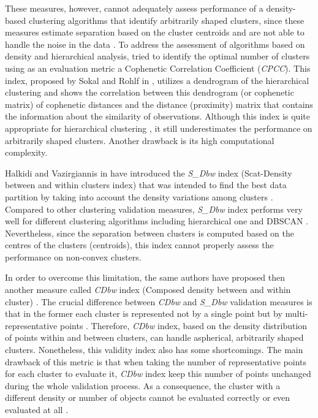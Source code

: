 \documentclass[fontsize=12pt,a4paper,twoside,openany]{scrbook}
\begin{document}
These measures, however, cannot adequately assess performance of a density-based clustering algorithms that identify arbitrarily shaped clusters, since these measures estimate separation based on the cluster centroids and are not able to handle the noise in the data \parencite{Moulavi14}. To address the assessment of algorithms based on density and hierarchical analysis, \textcite{Saracli13} tried to identify the optimal number of clusters using as an evaluation metric a Cophenetic Correlation Coefficient (\emph{CPCC}). This index, proposed by Sokal and Rohlf in \cite*{Sokal62}, utilizes a dendrogram of the hierarchical clustering and shows the correlation between this dendrogram (or cophenetic matrix) of cophenetic distances and the distance (proximity) matrix that contains the information about the similarity of observations. Although this index is quite appropriate for hierarchical clustering \parencite{Palacio19}, it still underestimates the performance on arbitrarily shaped clusters. Another drawback is its high computational complexity.

Halkidi and Vazirgiannis in \cite*{Halkidi01b} have introduced the \emph{S\_Dbw} index (Scat-Density between and within clusters index) that was intended to find the best data partition by taking into account the density variations among clusters \parencite{Halkidi01b}. Compared to other clustering validation measures, \emph{S\_Dbw} index performs very well for different clustering algorithms including hierarchical one and DBSCAN \parencite{Liu10}. Nevertheless, since the separation between clusters is computed based on the centres of the clusters (centroids), this index cannot properly assess the performance on non-convex clusters.

In order to overcome this limitation, the same authors have proposed then another measure called \emph{CDbw} index (Composed density between and within cluster) \parencite{Halkidi08}. The crucial difference between \emph{CDbw} and \emph{S\_Dbw} validation measures is that in the former each cluster is represented not by a single point but by multi-representative points \parencite{Halkidi08}. Therefore, \emph{CDbw} index, based on the density distribution of points within and between clusters, can handle aspherical, arbitrarily shaped clusters. Nonetheless, this validity index also has some shortcomings. The main drawback of this metric is that when taking the number of representative points for each cluster to evaluate it, \emph{CDbw} index keep this number of points unchanged during the whole validation process. As a consequence, the cluster with a different density or number of objects cannot be evaluated correctly or even evaluated at all \parencite{Moulavi14}.
\end{document}
